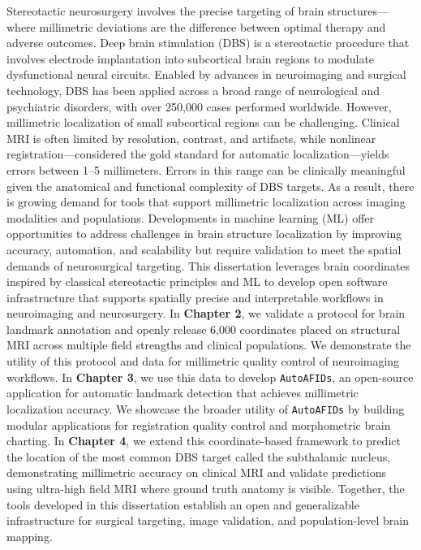 \onehalfspacing
Stereotactic neurosurgery involves the precise targeting of brain structures---where millimetric deviations are the difference between optimal therapy and adverse outcomes. Deep brain stimulation (DBS) is a stereotactic procedure that involves electrode implantation into subcortical brain regions to modulate dysfunctional neural circuits. Enabled by advances in neuroimaging and surgical technology, DBS has been applied across a broad range of neurological and psychiatric disorders, with over 250,000 cases performed worldwide. However, millimetric localization of small subcortical regions can be challenging. Clinical MRI is often limited by resolution, contrast, and artifacts, while nonlinear registration—considered the gold standard for automatic localization—yields errors between 1–5 millimeters. Errors in this range can be clinically meaningful given the anatomical and functional complexity of DBS targets. As a result, there is growing demand for tools that support millimetric localization across imaging modalities and populations. Developments in machine learning (ML) offer opportunities to address challenges in brain structure localization by improving accuracy, automation, and scalability but require validation to meet the spatial demands of neurosurgical targeting. This dissertation leverages brain coordinates inspired by classical stereotactic principles and ML to develop open software infrastructure that supports spatially precise and interpretable workflows in neuroimaging and neurosurgery. In \textbf{Chapter 2}, we validate a protocol for brain landmark annotation and openly release 6,000 coordinates placed on structural MRI across multiple field strengths and clinical populations. We demonstrate the utility of this protocol and data for millimetric quality control of neuroimaging workflows. In \textbf{Chapter 3}, we use this data to develop \texttt{AutoAFIDs}, an open-source application for automatic landmark detection that achieves millimetric localization accuracy. We showcase the broader utility of \texttt{AutoAFIDs} by building modular applications for registration quality control and morphometric brain charting. In \textbf{Chapter 4}, we extend this coordinate-based framework to predict the location of the most common DBS target called the subthalamic nucleus, demonstrating millimetric accuracy on clinical MRI and validate predictions using ultra-high field MRI where ground truth anatomy is visible. Together, the tools developed in this dissertation establish an open and generalizable infrastructure for surgical targeting, image validation, and population-level brain mapping.

